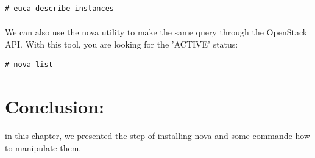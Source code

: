 \begin{lstlisting}[language={[Latex]TeX}, frame=single]
# euca-describe-instances
\end{lstlisting}

\paragraph{}We can also use the nova utility to make the same query through the OpenStack API. With this tool, you are looking for the 'ACTIVE' status:\par

\begin{lstlisting}[language={[Latex]TeX}, frame=single]
# nova list
\end{lstlisting}
\section{Conclusion: }
in this chapter, we presented the step of installing nova and some commande how to manipulate them.